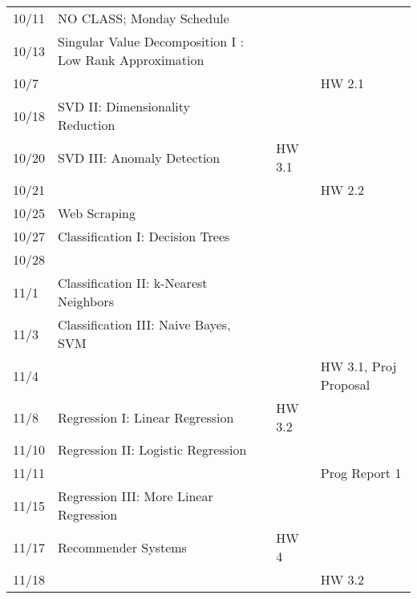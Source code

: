 \documentclass[11pt]{article}
\begin{document}
\begin{centering}
\begin{tabular}{||l|p{3in}|l|l|l||}
10/11 &  NO CLASS; Monday Schedule &  & &  \\   
10/13 & Singular Value Decomposition I : Low Rank Approximation & & & \\
10/7 &&&& HW 2.1 \\
\hline

10/18 & SVD II: Dimensionality Reduction &&&\\
%
10/20 & SVD III: Anomaly Detection & & HW 3.1 & \\ 
10/21 &&&& HW 2.2 \\

\hline

 10/25 & Web Scraping & &  & \\ 
10/27 & Classification I: Decision Trees & & & \\ 
10/28 &&&& \\
\hline

11/1 & Classification II: k-Nearest Neighbors & &  &\\ 
11/3 & Classification III: Naive Bayes, SVM & & &\\ 
11/4 &&&& HW 3.1, Proj Proposal\\
\hline

11/8 & Regression I: Linear Regression && HW 3.2  &\\ 
11/10 & Regression II: Logistic Regression & & & \\ 
11/11 &&&& Prog Report 1\\
\hline

11/15 & Regression III: More Linear Regression & & &\\ 
11/17 & Recommender Systems & & HW 4 & \\
11/18 &&&& HW 3.2\\
\hline


\end{tabular}
\end{centering}
\end{document}
